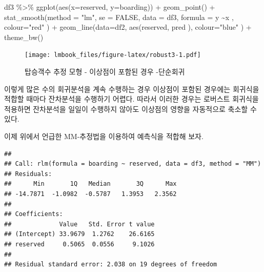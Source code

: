 \documentclass[
  10pt,
]{book}
\newenvironment{Shaded}{\begin{snugshade}}{\end{snugshade}}
\newcommand{\AttributeTok}[1]{\textcolor[rgb]{0.77,0.63,0.00}{#1}}
\newcommand{\ConstantTok}[1]{\textcolor[rgb]{0.00,0.00,0.00}{#1}}
\newcommand{\FunctionTok}[1]{\textcolor[rgb]{0.00,0.00,0.00}{#1}}
\newcommand{\NormalTok}[1]{#1}
\newcommand{\OtherTok}[1]{\textcolor[rgb]{0.56,0.35,0.01}{#1}}
\newcommand{\SpecialCharTok}[1]{\textcolor[rgb]{0.00,0.00,0.00}{#1}}
\newcommand{\StringTok}[1]{\textcolor[rgb]{0.31,0.60,0.02}{#1}}
\theoremstyle{definition}
\theoremstyle{definition}
\theoremstyle{definition}
\theoremstyle{definition}
\theoremstyle{remark}
\begin{document}
\begin{Shaded}
\begin{Highlighting}[]
\NormalTok{df3 }\SpecialCharTok{\%\textgreater{}\%} \FunctionTok{ggplot}\NormalTok{(}\FunctionTok{aes}\NormalTok{(}\AttributeTok{x=}\NormalTok{reserved, }\AttributeTok{y=}\NormalTok{boarding)) }\SpecialCharTok{+} 
  \FunctionTok{geom\_point}\NormalTok{() }\SpecialCharTok{+} 
  \FunctionTok{stat\_smooth}\NormalTok{(}\AttributeTok{method =} \StringTok{"lm"}\NormalTok{, }\AttributeTok{se =} \ConstantTok{FALSE}\NormalTok{, }\AttributeTok{data =}\NormalTok{ df3,}
              \AttributeTok{formula =}\NormalTok{ y }\SpecialCharTok{\textasciitilde{}}\NormalTok{x , }\AttributeTok{colour=}\StringTok{"red"}\NormalTok{ ) }\SpecialCharTok{+}
  \FunctionTok{geom\_line}\NormalTok{(}\AttributeTok{data=}\NormalTok{df2, }\FunctionTok{aes}\NormalTok{(reserved, pred ), }\AttributeTok{colour=}\StringTok{"blue"}\NormalTok{   ) }\SpecialCharTok{+} 
  \FunctionTok{theme\_bw}\NormalTok{()}
\end{Highlighting}
\end{Shaded}

\begin{figure}
\centering
\texttt{[image: lmbook\_files/figure-latex/robust3-1.pdf]}
\caption{\label{fig:robust3}탑승객수 추정 모형 - 이상점이 포함된 경우 -단순회귀}
\end{figure}

이렇게 많은 수의 회귀분석을 계속 수행하는 경우 이상점이 포함된 경우에는 회귀식을 적합할 때마다 잔차분석을 수행하기 어렵다. 따라서 이러한 경우는 로버스트 회귀식을 적용하면 잔차분석을 일일이 수행하지 않아도 이상점의 영향을 자동적으로 축소할 수 있다.

이제 위에서 언급한 MM-추정법을 이용하여 예측식을 적합해 보자.

\begin{Shaded}
\end{Shaded}

\begin{verbatim}
## 
## Call: rlm(formula = boarding ~ reserved, data = df3, method = "MM")
## Residuals:
##      Min       1Q   Median       3Q      Max 
## -14.7871  -1.0982  -0.5787   1.3953   2.3562 
## 
## Coefficients:
##             Value   Std. Error t value
## (Intercept) 33.9679  1.2762    26.6165
## reserved     0.5065  0.0556     9.1026
## 
## Residual standard error: 2.038 on 19 degrees of freedom
\end{verbatim}
\end{document}
